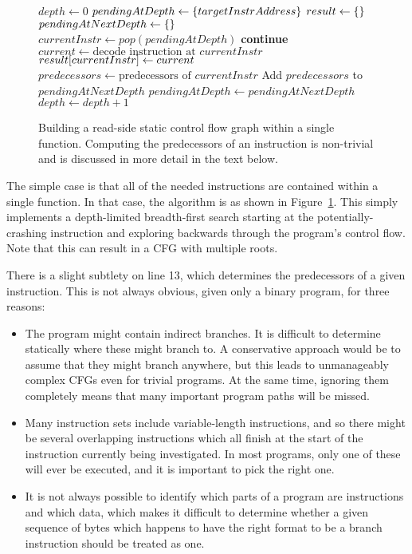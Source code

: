 \begin{figure}
\begin{algorithmic}[1]
\State $depth \gets 0$
\State $pendingAtDepth \gets \{targetInstrAddress\}$
\State $result \gets \{\}$
  \State $pendingAtNextDepth \gets \{\}$
    \State $currentInstr \gets pop(pendingAtDepth)$
      \State \textbf{continue}
    \EndIf
    \State $current \gets \text{decode instruction at } currentInstr$
    \State $result[currentInstr] \gets current$
    \State $predecessors \gets \text{predecessors of } currentInstr$
    \State Add $predecessors$ to $pendingAtNextDepth$
  \EndWhile
  \State $pendingAtDepth \gets pendingAtNextDepth$
  \State $depth \gets depth + 1$
\EndWhile
\end{algorithmic}
\caption{Building a read-side static control flow graph within a
  single function.  Computing the predecessors of an instruction is
  non-trivial and is discussed in more detail in the text below.}
\label{fig:derive:static_read_cfg_single_function}
\end{figure}

The simple case is that all of the needed instructions are contained
within a single function.  In that case, the algorithm is as shown in
Figure~\ref{fig:derive:static_read_cfg_single_function}.  This simply
implements a depth-limited breadth-first search starting at the
potentially-crashing instruction and exploring backwards through the
program's control flow.  Note that this can result in a CFG with
multiple roots.

There is a slight subtlety on line 13, which determines the
predecessors of a given instruction.  This is not always obvious,
given only a binary program, for three reasons:

\begin{itemize}
\item
  The program might contain indirect branches.  It is difficult to
  determine statically where these might branch to.  A conservative
  approach would be to assume that they might branch anywhere, but
  this leads to unmanageably complex CFGs even for trivial programs.
  At the same time, ignoring them completely means that many important
  program paths will be missed.
\item
  Many instruction sets include variable-length instructions, and so
  there might be several overlapping instructions which all finish at
  the start of the instruction currently being investigated.  In most
  programs, only one of these will ever be executed, and it is
  important to pick the right one.
\item
  It is not always possible to identify which parts of a program are
  instructions and which data, which makes it difficult to determine
  whether a given sequence of bytes which happens to have the right
  format to be a branch instruction should be treated as one.
\end{itemize}

